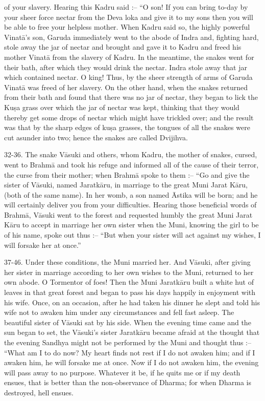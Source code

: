 of your slavery. Hearing this Kadru said :-- ``O son! If you can bring to-day by your sheer force nectar from the Deva loka and give it to my sons then you will be able to free your helpless mother. When Kadru said so, the highly powerful Vinat\=a's son, Garuda immediately went to the abode of Indra and, fighting hard, stole away the jar of nectar and brought and gave it to Kadru and freed his mother Vinat\=a from the slavery of Kadru. In the meantime, the snakes went for their bath, after which they would drink the nectar. Indra stole away that jar which contained nectar. O king! Thus, by the sheer strength of arms of Garuda Vinat\=a was freed of her slavery. On the other hand, when the snakes returned from their bath and found that there was no jar of nectar, they began to lick the Ku\d{s}a grass over which the jar of nectar was kept, thinking that they would thereby get some drops of nectar which might have trickled over; and the result was that by the sharp edges of ku\d{s}a grasses, the tongues of all the snakes were cut asunder into two; hence the snakes are called Dvijihva.

32-36. The snake V\=asuki and others, whom Kadru, the mother of snakes, cursed, went to Brahm\=a and took his refuge and informed all of the cause of their terror, the curse from their mother; when Brahm\=a spoke to them :-- ``Go and give the sister of V\=asuki, named Jaratk\=aru, in marriage to the great Muni Jarat K\=aru, (both of the same name). In her womb, a son named \=Astika will be born; and he will certainly deliver you from your difficulties. Hearing those beneficial words of Brahm\=a, V\=asuki went to the forest and requested humbly the great Muni Jarat K\=aru to accept in marriage her own sister when the Muni, knowing the girl to be of his name, spoke out thus :-- ``But when your sister will act against my wishes, I will forsake her at once.''

37-46. Under these conditions, the Muni married her. And V\=asuki, after giving her sister in marriage according to her own wishes to the Muni, returned to her own abode. O Tormentor of foes! Then the Muni Jaratk\=aru built a white hut of leaves in that great forest and began to pass his days happily in enjoyment with his wife. Once, on an occasion, after he had taken his dinner he slept and told his wife not to awaken him under any circumstances and fell fast asleep. The beautiful sister of V\=asuki sat by his side. When the evening time came and the sun began to set, the V\=asuki's sister Jaratk\=aru became afraid at the thought that the evening Sandhya might not be performed by the Muni and thought thus :-- ``What am I to do now? My heart finds not rest if I do not awaken him; and if I awaken him, he will forsake me at once. Now if I do not awaken him, the evening will pass away to no purpose. Whatever it be, if he quits me or if my death ensues, that is better than the non-observance of Dharma; for when Dharma is destroyed, hell ensues.

